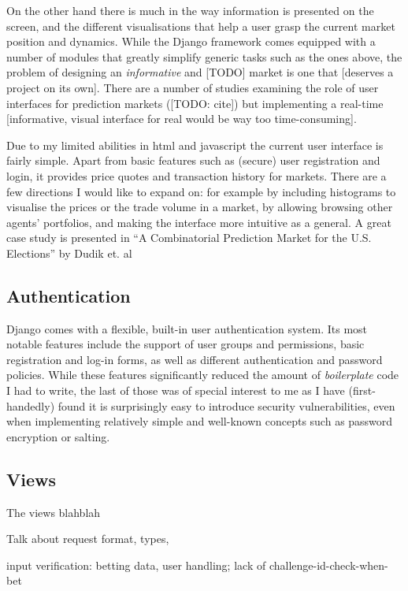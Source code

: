 \documentclass[bsc,frontabs,twoside,singlespacing,parskip,deptreport]{infthesis}     %
\begin{document}
\begin{itemize}
On the other hand there is much in the way information is presented on the screen, and the different visualisations that help a user grasp the current market position and dynamics. While the Django framework comes equipped with a number of modules that greatly simplify generic tasks such as the ones above, the problem of designing an {\em informative} and [TODO] market is one that [deserves a project on its own]. There are a number of studies examining the role of user interfaces for prediction markets ([TODO: cite]) but implementing a real-time [informative, visual interface for real would be way too time-consuming]. 


    Due to my limited abilities in html and javascript the current user interface is fairly simple. Apart from basic features such as (secure) user registration and login, it provides price quotes and transaction history for markets. There are a few directions I would like to expand on: for example by including histograms to visualise the prices or the trade volume in a market, by allowing browsing other agents’ portfolios, and making the interface more intuitive as a general. A great case study is presented in “A Combinatorial Prediction Market for the U.S. Elections” by Dudik et. al

\subsection{Authentication}

	Django comes with a flexible, built-in user authentication system. Its most notable features include the support of user groups and permissions, basic registration and log-in forms, as well as different authentication and password policies. While these features significantly reduced the amount of {\it boilerplate} code I had to write, the last of those was of special interest to me as I have (first-handedly) found it is surprisingly easy to introduce security vulnerabilities, even when implementing relatively simple and well-known concepts such as password encryption or salting. 



	


\subsection{Views}
	The views blahblah

Talk about request format, types, 

input verification: betting data, user handling; lack of challenge-id-check-when-bet


\end{itemize}
\end{document}
